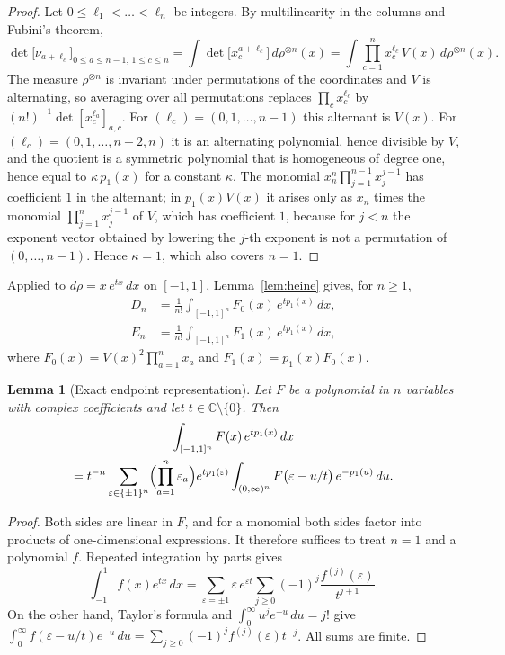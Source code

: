 \documentclass[11pt]{amsart}
\newtheorem{lemma}[theorem]{Lemma}
\theoremstyle{remark}
\numberwithin{equation}{section}
\newcommand{\C}{\mathbb{C}}
\begin{document}
\begin{proof}
Let $0\le\ell_1<\dots<\ell_n$ be integers. By multilinearity in the columns and Fubini's theorem,
\[
\det\bigl[\nu_{a+\ell_c}\bigr]_{0\le a\le n-1,\,1\le c\le n}
=\int\det\bigl[x_c^{a+\ell_c}\bigr]\,d\rho^{\otimes n}(x)
=\int\prod_{c=1}^nx_c^{\ell_c}\,V(x)\,d\rho^{\otimes n}(x).
\]
The measure $\rho^{\otimes n}$ is invariant under permutations of the coordinates and $V$ is alternating, so averaging over all permutations replaces $\prod_cx_c^{\ell_c}$ by $(n!)^{-1}\det[x_c^{\ell_a}]_{a,c}$. For $(\ell_c)=(0,1,\dots,n-1)$ this alternant is $V(x)$. For $(\ell_c)=(0,1,\dots,n-2,n)$ it is an alternating polynomial, hence divisible by $V$, and the quotient is a symmetric polynomial that is homogeneous of degree one, hence equal to $\kappa\,p_1(x)$ for a constant $\kappa$. The monomial $x_n^{n}\prod_{j=1}^{n-1}x_j^{j-1}$ has coefficient $1$ in the alternant; in $p_1(x)V(x)$ it arises only as $x_n$ times the monomial $\prod_{j=1}^{n}x_j^{j-1}$ of $V$, which has coefficient $1$, because for $j<n$ the exponent vector obtained by lowering the $j$-th exponent is not a permutation of $(0,\dots,n-1)$. Hence $\kappa=1$, which also covers $n=1$.
\end{proof}

Applied to $d\rho=x\,e^{tx}\,dx$ on $[-1,1]$, Lemma~\ref{lem:heine} gives, for $n\ge1$,
\begin{equation}\label{eq:heine-DE}
\begin{aligned}
D_n&=\frac1{n!}\int_{[-1,1]^n}F_0(x)\,e^{tp_1(x)}\,dx,\\
E_n&=\frac1{n!}\int_{[-1,1]^n}F_1(x)\,e^{tp_1(x)}\,dx,
\end{aligned}
\end{equation}
where $F_0(x)=V(x)^2\prod_{a=1}^nx_a$ and $F_1(x)=p_1(x)F_0(x)$.

\begin{lemma}[Exact endpoint representation]\label{lem:endpoint}
Let $F$ be a polynomial in $n$ variables with complex coefficients and let $t\in\C\setminus\{0\}$. Then
\begin{multline*}
\int_{[-1,1]^n}F(x)\,e^{tp_1(x)}\,dx\\
=t^{-n}\sum_{\varepsilon\in\{\pm1\}^n}\Bigl(\prod_{a=1}^n\varepsilon_a\Bigr)e^{tp_1(\varepsilon)}\int_{(0,\infty)^n}F\bigl(\varepsilon-u/t\bigr)\,e^{-p_1(u)}\,du .
\end{multline*}
\end{lemma}

\begin{proof}
Both sides are linear in $F$, and for a monomial both sides factor into products of one-dimensional expressions. It therefore suffices to treat $n=1$ and a polynomial $f$. Repeated integration by parts gives
\[
\int_{-1}^1f(x)e^{tx}\,dx=\sum_{\varepsilon=\pm1}\varepsilon\,e^{\varepsilon t}\sum_{j\ge0}(-1)^j\frac{f^{(j)}(\varepsilon)}{t^{j+1}}.
\]
On the other hand, Taylor's formula and $\int_0^\infty u^je^{-u}\,du=j!$ give $\int_0^\infty f(\varepsilon-u/t)e^{-u}\,du=\sum_{j\ge0}(-1)^jf^{(j)}(\varepsilon)t^{-j}$. All sums are finite.
\end{proof}
\end{document}
